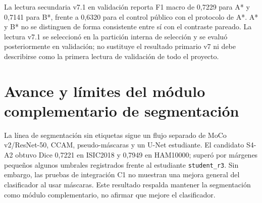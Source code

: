 La lectura secundaria v7.1 en validación reporta F1 macro de 0,7229 para A* y 0,7141 para B*, frente a 0,6320 para el control público con el protocolo de A*. A* y B* no se distinguen de forma consistente entre sí con el contraste pareado. La lectura v7.1 se seleccionó en la partición interna de selección y se evaluó posteriormente en validación; no sustituye el resultado primario v7 ni debe describirse como la primera lectura de validación de todo el proyecto.

\section{Avance y límites del módulo complementario de segmentación}

La línea de segmentación sin etiquetas sigue un flujo separado de MoCo v2/ResNet-50, CCAM, pseudo-máscaras y un U-Net estudiante. El candidato S4-A2 obtuvo Dice 0,7221 en ISIC2018 y 0,7949 en HAM10000; superó por márgenes pequeños algunos umbrales registrados frente al estudiante \texttt{student\_r3}. Sin embargo, las pruebas de integración C1 no muestran una mejora general del clasificador al usar máscaras. Este resultado respalda mantener la segmentación como módulo complementario, no afirmar que mejore el clasificador.
